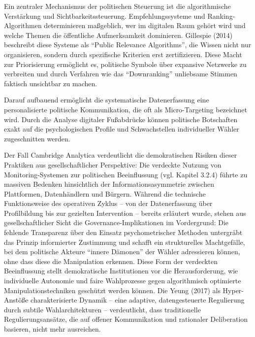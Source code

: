 Ein zentraler Mechanismus der politischen Steuerung ist die algorithmische Verstärkung und Sichtbarkeitssteuerung. Empfehlungssysteme und Ranking-Algorithmen determinieren maßgeblich, wer im digitalen Raum gehört wird und welche Themen die öffentliche Aufmerksamkeit dominieren. Gillespie (2014) beschreibt diese Systeme als \enquote{Public Relevance Algorithms}, die Wissen nicht nur organisieren, sondern durch spezifische Kriterien erst zertifizieren. Diese Macht zur Priorisierung ermöglicht es, politische Symbole über expansive Netzwerke zu verbreiten und durch Verfahren wie das \enquote{Downranking} unliebsame Stimmen faktisch unsichtbar zu machen.

Darauf aufbauend ermöglicht die systematische Datenerfassung eine personalisierte politische Kommunikation, die oft als Micro-Targeting bezeichnet wird. Durch die Analyse digitaler Fußabdrücke können politische Botschaften exakt auf die psychologischen Profile und Schwachstellen individueller Wähler zugeschnitten werden.

Der Fall Cambridge Analytica verdeutlicht die demokratischen Risiken dieser Praktiken aus gesellschaftlicher Perspektive: Die verdeckte Nutzung von Monitoring-Systemen zur politischen Beeinflussung (vgl. Kapitel 3.2.4) führte zu massiven Bedenken hinsichtlich der Informationsasymmetrie zwischen Plattformen, Datenhändlern und Bürgern. Während die technische Funktionsweise des operativen Zyklus -- von der Datenerfassung über Profilbildung bis zur gezielten Intervention -- bereits erläutert wurde, stehen aus gesellschaftlicher Sicht die Governance-Implikationen im Vordergrund: Die fehlende Transparenz über den Einsatz psychometrischer Methoden untergräbt das Prinzip informierter Zustimmung und schafft ein strukturelles Machtgefälle, bei dem politische Akteure \enquote{innere Dämonen} der Wähler adressieren können, ohne dass diese die Manipulation erkennen. Diese Form der verdeckten Beeinflussung stellt demokratische Institutionen vor die Herausforderung, wie individuelle Autonomie und faire Wahlprozesse gegen algorithmisch optimierte Manipulationstechniken geschützt werden können. Die Yeung (2017) als Hyper-Anstöße charakterisierte Dynamik -- eine adaptive, datengesteuerte Regulierung durch subtile Wahlarchitekturen -- verdeutlicht, dass traditionelle Regulierungsansätze, die auf offener Kommunikation und rationaler Deliberation basieren, nicht mehr ausreichen.

